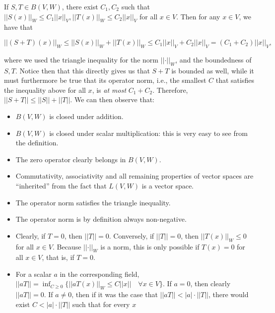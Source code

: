 \begin{solution}

    If $S, T \in B(V, W)$, there exist $C_1, C_2$ such that $\lvert \lvert S(x) \rvert \rvert_W \leq C_1 \lvert \lvert x \rvert \rvert_V, \lvert \lvert T(x) \rvert \rvert_W \leq C_2 \lvert \lvert x \rvert \rvert_V$ for all $x \in V$.
    Then for any $x \in V$, we have that

    \[\lvert \lvert (S + T)(x) \rvert \rvert_W \leq \lvert \lvert S(x) \rvert \rvert_W + \lvert \lvert T(x) \rvert \rvert_W \leq C_1 \lvert \lvert x \rvert \rvert_V + C_2 \lvert \lvert x \rvert \rvert_V = (C_1 + C_2) \lvert \lvert x \rvert \rvert_V,\]

    where we used the triangle inequality for the norm $\lvert \lvert \cdot \rvert \rvert_W$, and the boundedness of $S, T$.
    Notice then that this directly gives us that $S + T$ is bounded as well, while it must furthermore be true that its operator norm, i.e., the smallest $C$ that satisfies the inequality above for all $x$, is \textit{at most} $C_1 + C_2$.
    Therefore, $\lvert \lvert S + T \rvert \rvert \leq \lvert \lvert S \rvert \rvert + \lvert \lvert T \rvert \rvert$.
    We can then observe that:
    \begin{itemize}
        \item $B(V, W)$ is closed under addition.
        \item $B(V, W)$ is closed under scalar multiplication: this is very easy to see from the definition.
        \item The zero operator clearly belongs in $B(V, W)$.
        \item Commutativity, associativity and all remaining properties of vector spaces are ``inherited'' from the fact that $L(V, W)$ is a vector space.
        \item The operator norm satisfies the triangle inequality.
        \item The operator norm is by definition always non-negative.
        \item Clearly, if $T = 0$, then $\lvert \lvert T \rvert \rvert = 0$.
        Conversely, if $\lvert \lvert T \rvert \rvert = 0$, then $\lvert \lvert T(x) \rvert \rvert_W \leq 0$ for all $x \in V$.
        Because $\lvert \lvert \cdot \rvert \rvert_W$ is a norm, this is only possible if $T(x) = 0$ for all $x \in V$, that is, if $T = 0$.
        \item For a scalar $a$ in the corresponding field, $\lvert \lvert a T \rvert \rvert = \inf_{C \geq 0} \{ \lvert \lvert a T(x) \rvert \rvert_W \leq C \lvert \lvert x \rvert \rvert \quad \forall x \in V \}$.
        If $a = 0$, then clearly $\lvert \lvert a T \rvert \rvert = 0$.
        If $a \neq 0$, then if it was the case that $\lvert \lvert a T \rvert \rvert < \lvert a \rvert \cdot \lvert \lvert T \rvert \rvert$, there would exist $C < \lvert a \rvert \cdot \lvert \lvert T \rvert \rvert$ such that for every $x$


\end{itemize}
\end{solution}
